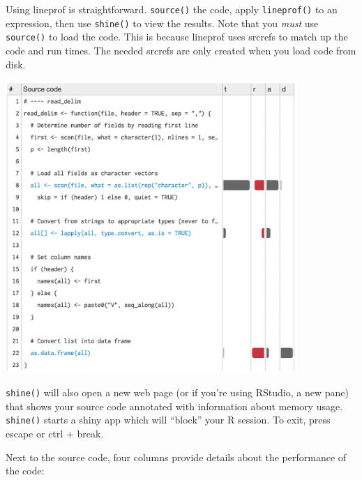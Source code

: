 Using lineprof is straightforward. \texttt{source()} the code, apply
\texttt{lineprof()} to an expression, then use \texttt{shine()} to view
the results. Note that you \emph{must} use \texttt{source()} to load the
code. This is because lineprof uses srcrefs to match up the code and run
times. The needed srcrefs are only created when you load code from disk.

\begin{Shaded}
\begin{Highlighting}[]

\NormalTok{(}\NormalTok{)}
\StringTok{ }\NormalTok{(}\NormalTok{(}\NormalTok{))}
\end{Highlighting}
\end{Shaded}

\includegraphics[width=4.35in]{screenshots/memory-lineprof.png}

\texttt{shine()} will also open a new web page (or if you're using
RStudio, a new pane) that shows your source code annotated with
information about memory usage. \texttt{shine()} starts a shiny app
which will ``block'' your R session. To exit, press escape or ctrl +
break.

Next to the source code, four columns provide details about the
performance of the code:

